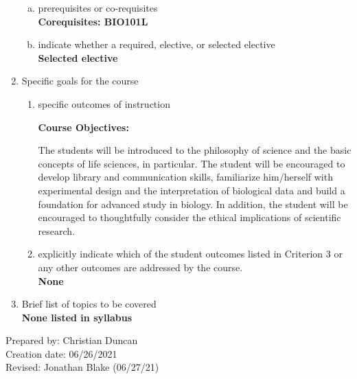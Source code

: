 \begin{enumerate}[1.]
\begin{enumerate}[a.]
\item prerequisites or co-requisites\\
  {\bfseries
    Corequisites: BIO101L
  }

\item indicate whether a required, elective, or selected elective\\ %
  {\bfseries
    Selected elective
  }

\end{enumerate}

\item Specific goals for the course
\begin{enumerate}
\item specific outcomes of instruction\\ %
  {\bfseries
    Course Objectives:

  The students will be introduced to the philosophy of science and the basic concepts of life sciences, in particular.  The student will be encouraged to develop library and communication skills, familiarize him/herself with experimental design and the interpretation of biological data and build a foundation for advanced study in biology.  In addition, the student will be encouraged to thoughtfully consider the ethical implications of scientific research.

  }

\item explicitly indicate which of the student outcomes listed in Criterion 3 or any other outcomes are addressed by the course.\\
  {\bfseries
    None
  }
\end{enumerate}

\item Brief list of topics to be covered\\
  {\bfseries
    None listed in syllabus
  }

\end{enumerate}

\noindent Prepared by: Christian Duncan\\
\noindent Creation date: 06/26/2021\\
\noindent Revised: Jonathan Blake (06/27/21)\\
